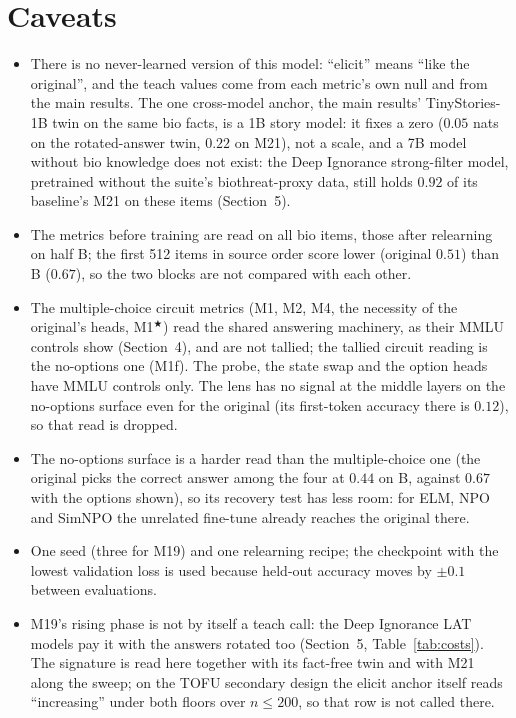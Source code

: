 \documentclass[11pt]{article}
\newenvironment{steps}{\begin{itemize}[nosep,leftmargin=1.2em,topsep=2pt]}{\end{itemize}}
\begin{document}
\section*{Caveats}
\begin{steps}
\item There is no never-learned version of this model: ``elicit'' means ``like the original'', and
the teach values come from each metric's own null and from the main results. The one cross-model
anchor, the main results' TinyStories-1B twin on the same bio facts, is a 1B story model: it fixes a
zero ($0.05$ nats on the rotated-answer twin, $0.22$ on M21), not a scale, and a 7B model without bio
knowledge does not exist: the Deep Ignorance strong-filter model, pretrained without the suite's
biothreat-proxy data, still holds $0.92$ of its baseline's M21 on these items (Section~5).
\item The metrics before training are read on all bio items, those after relearning on half B;
the first 512 items in source order score lower (original $0.51$) than B ($0.67$), so the two blocks
are not compared with each other.
\item The multiple-choice circuit metrics (M1, M2, M4, the necessity of the original's heads, M1$^\bigstar$)
read the shared answering machinery, as their MMLU controls show (Section~4), and are not tallied;
the tallied circuit reading is the no-options one (M1f). The probe, the state swap and the option
heads have MMLU controls only. The lens has no signal at the middle layers on the no-options surface
even for the original (its first-token accuracy there is $0.12$), so that read is dropped.
\item The no-options surface is a harder read than the multiple-choice one (the original picks the
correct answer among the four at $0.44$ on B, against $0.67$ with the options shown), so its
recovery test has less room: for ELM, NPO and SimNPO the unrelated fine-tune already reaches the
original there.
\item One seed (three for M19) and one relearning recipe; the checkpoint with the lowest validation
loss is used because held-out accuracy moves by $\pm0.1$ between evaluations.
\item M19's rising phase is not by itself a teach call: the Deep Ignorance LAT models pay it with
the answers rotated too (Section~5, Table~\ref{tab:costs}). The signature is read here together with
its fact-free twin and with M21 along the sweep; on the TOFU secondary design the elicit anchor
itself reads ``increasing'' under both floors over $n\le200$, so that row is not called there.

\end{steps}
\end{document}
